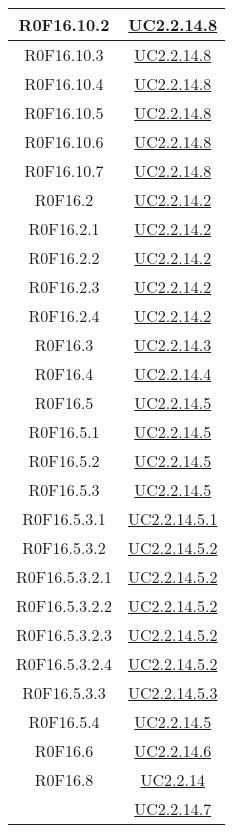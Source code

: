 \documentclass[../AnalisiDeiRequisiti.tex]{subfiles}
\begin{document}
\begin{longtable}{|c|c|}
	R0F16.10.2 & \hyperlink{UC2.2.14.8}{UC2.2.14.8}\\\hline
	R0F16.10.3 & \hyperlink{UC2.2.14.8}{UC2.2.14.8}\\\hline
	R0F16.10.4 & \hyperlink{UC2.2.14.8}{UC2.2.14.8}\\\hline
	R0F16.10.5 & \hyperlink{UC2.2.14.8}{UC2.2.14.8}\\\hline
	R0F16.10.6 & \hyperlink{UC2.2.14.8}{UC2.2.14.8}\\\hline
	R0F16.10.7 & \hyperlink{UC2.2.14.8}{UC2.2.14.8}\\\hline
	R0F16.2 & \hyperlink{UC2.2.14.2}{UC2.2.14.2}\\\hline
	R0F16.2.1 & \hyperlink{UC2.2.14.2}{UC2.2.14.2}\\\hline
	R0F16.2.2 & \hyperlink{UC2.2.14.2}{UC2.2.14.2}\\\hline
	R0F16.2.3 & \hyperlink{UC2.2.14.2}{UC2.2.14.2}\\\hline
	R0F16.2.4 & \hyperlink{UC2.2.14.2}{UC2.2.14.2}\\\hline
	R0F16.3 & \hyperlink{UC2.2.14.3}{UC2.2.14.3}\\\hline
	R0F16.4 & \hyperlink{UC2.2.14.4}{UC2.2.14.4}\\\hline
	R0F16.5 & \hyperlink{UC2.2.14.5}{UC2.2.14.5}\\\hline
	R0F16.5.1 & \hyperlink{UC2.2.14.5}{UC2.2.14.5}\\\hline
	R0F16.5.2 & \hyperlink{UC2.2.14.5}{UC2.2.14.5}\\\hline
	R0F16.5.3 & \hyperlink{UC2.2.14.5}{UC2.2.14.5}\\\hline
	R0F16.5.3.1 & \hyperlink{UC2.2.14.5.1}{UC2.2.14.5.1}\\\hline
	R0F16.5.3.2 & \hyperlink{UC2.2.14.5.2}{UC2.2.14.5.2}\\\hline
	R0F16.5.3.2.1 & \hyperlink{UC2.2.14.5.2}{UC2.2.14.5.2}\\\hline
	R0F16.5.3.2.2 & \hyperlink{UC2.2.14.5.2}{UC2.2.14.5.2}\\\hline
	R0F16.5.3.2.3 & \hyperlink{UC2.2.14.5.2}{UC2.2.14.5.2}\\\hline
	R0F16.5.3.2.4 & \hyperlink{UC2.2.14.5.2}{UC2.2.14.5.2}\\\hline
	R0F16.5.3.3 & \hyperlink{UC2.2.14.5.3}{UC2.2.14.5.3}\\\hline
	R0F16.5.4 & \hyperlink{UC2.2.14.5}{UC2.2.14.5}\\\hline
	R0F16.6 & \hyperlink{UC2.2.14.6}{UC2.2.14.6}\\\hline
	R0F16.8 & \hyperlink{UC2.2.14}{UC2.2.14}\\& \hyperlink{UC2.2.14.7}{UC2.2.14.7}\\\hline

\end{longtable}
\end{document}
